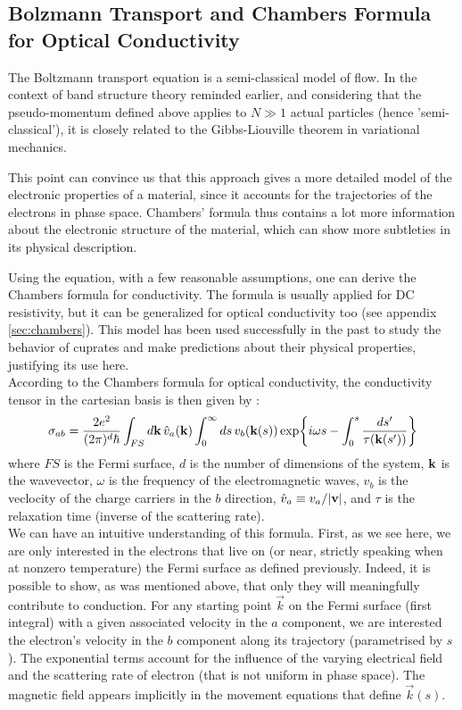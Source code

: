 \subsection{Bolzmann Transport and Chambers Formula for Optical Conductivity}
The Boltzmann transport equation is a semi-classical model of flow. 
In the context of band structure theory reminded earlier, 
and considering that the pseudo-momentum defined above applies to $N\gg 1$ actual particles (hence 'semi-classical'), 
it is closely related to the Gibbs-Liouville theorem in variational mechanics. 

This point can convince us that this approach gives a more detailed model of the electronic properties of a material, 
since it accounts for the trajectories of the electrons in phase space. 
Chambers' formula thus contains a lot more information about the electronic structure
of the material, 
which can show more subtleties in its physical description.

Using the equation, with a few reasonable assumptions, 
one can derive the Chambers formula for conductivity. 
The formula is usually applied for DC resistivity, 
but it can be generalized for optical conductivity too (see appendix \ref{sec:chambers}).
This model has been used successfully in the past to study the behavior of cuprates 
and make predictions about their physical properties\cite{grissonnanche2021}, 
justifying its use here. \\

According to the Chambers formula for optical conductivity, 
the conductivity tensor in the cartesian basis is then given by :
\begin{equation}
	\sigma_{ab} = \frac{2e^2}{(2\pi)^d\hbar}\int_{FS}\dd{\vb{k}}\hat{v}_a(\vb{k})
        \int_0^{\infty}\dd{s}v_b(\vb{k}(s))\exp{i\omega s
        - \int_0^s \frac{\mathop{ds'}}{\tau(\vb{k}(s'))}}
\end{equation}
where $FS$ is the Fermi surface, $d$ is the number of dimensions of the system, $\vb{k}$ is the
wavevector, $\omega$ is the frequency of the electromagnetic waves, $v_b$ is the veclocity of the
charge carriers in the $b$ direction, $\hat{v}_a\equiv v_a/\abs{\vb{v}}$, and $\tau$ is the
relaxation time (inverse of the scattering rate). \\

We can have an intuitive understanding of this formula. 
First, as we see here, we are only interested in the electrons that live on (or near, strictly speaking when at nonzero temperature) the Fermi surface as defined previously. 
Indeed, it is possible to show, as was mentioned above, that only they will meaningfully contribute to conduction. 
For any starting point $\vec{k}$ on the Fermi surface (first integral) with a given associated velocity in the $a$ component, 
we are interested the electron's velocity in the $b$ component along its trajectory (parametrised by $s$). 
The exponential terms account for the influence of the varying electrical field and the scattering rate of electron (that is not uniform in phase space). 
The magnetic field appears implicitly in the movement equations that define $\vec{k}(s)$.

